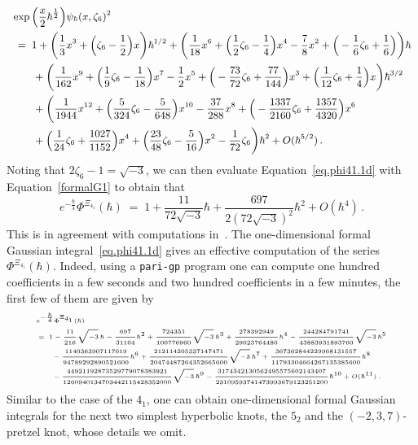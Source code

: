 \documentclass[12pt,reqno]{amsart}
\theoremstyle{definition}
\def\be{\begin{equation}}
\def\ee{\end{equation}}
\def\z{\zeta}
\def\hb{\hbar}
\renewcommand{\=}{\;=\;}
\begin{document}
\be
\begin{small}
\begin{aligned}
&\exp\Big(\frac{x}{2}\hbar^{\frac{1}{2}}\Big)\psi_{\hb}(x,\z_6)^2\\
&\=
1
+\bigg(\frac{1}{3}x^3 + \Big(\z_6 - \frac{1}{2}\Big)x\bigg)\hbar^{1/2}
+\bigg(\frac{1}{18}x^6 + \Big(\frac{1}{2}\z_6 - \frac{1}{4}\Big)x^4
- \frac{7}{8}x^2 + \Big(-\frac{1}{6}\z_6 + \frac{1}{6}\Big)\bigg)\hbar\\
&\qquad+ \bigg(\frac{1}{162}x^9 + \Big(\frac{1}{9}\z_6 - \frac{1}{18}\Big)x^7
- \frac{1}{2}x^5 + \Big(-\frac{73}{72}\z_6 + \frac{77}{144}\Big)x^3
+ \Big(\frac{1}{12}\z_6 + \frac{1}{4}\Big)x\bigg)\hbar^{3/2}\\
&\qquad+ \bigg(\frac{1}{1944}x^{12} + \Big(\frac{5}{324}\z_6
- \frac{5}{648}\Big)x^{10} - \frac{37}{288}x^8 + \Big(-\frac{1337}{2160}\z_6
+ \frac{1357}{4320}\Big)x^6\\
&\qquad+ \Big(\frac{1}{24}\z_6 + \frac{1027}{1152}\Big)x^4
+ \Big(\frac{23}{48}\z_6 - \frac{5}{16}\Big)x^2
- \frac{1}{72}\z_6\bigg)\hbar^{2}+O(\hbar^{5/2})\,.
\end{aligned}
\end{small}
\ee
Noting that $2\z_6-1=\sqrt{-3}$, we can then evaluate Equation~\eqref{eq.phi41.1d}
with Equation~\eqref{formalG1} to obtain that
\be
e^{-\frac{\hbar}{4}}\Phi^{\Xi_{4_1}}(\hbar) \=
1 + \frac{11}{72\sqrt{-3}}\hbar + \frac{697}{2(72\sqrt{-3})^2}\hbar^{2}+O(\hbar^{4})\,.
\ee
This is in agreement with computations in~\cite{DG,DGLZ,GZ:kashaev}.
The one-dimensional formal Gaussian integral~\eqref{eq.phi41.1d} gives an effective
computation of the series $\Phi^{\Xi_{4_1}}(\hbar)$.
%
%
Indeed, using a \texttt{pari-gp} program one can compute one
hundred coefficients in a few seconds and two hundred coefficients in a few minutes,
the first few of them are given by
\be
\begin{tiny}
\begin{aligned}
&e^{-\frac{\hbar}{4}}\Phi^{\Xi_{4_1}}(\hbar)\\
&=\;
1
- \frac{11}{216}\sqrt{-3}\,\hbar - \frac{697}{31104}\hbar^2
+ \frac{724351}{100776960}\sqrt{-3}\,\hbar^3
+ \frac{278392949}{29023764480}\hbar^4
- \frac{244284791741}{43883931893760}\sqrt{-3}\,\hbar^5\\
&\qquad- \frac{1140363907117019}{94789292890521600}\hbar^6
+ \frac{212114205337147471}{20474487264352665600}\sqrt{-3}\,\hbar^7
+ \frac{367362844229968131557}{11793304664267135385600}\hbar^8\\
&\qquad- \frac{44921192873529779078383921}{1260940134703442115428352000}\sqrt{-3}\,
\hbar^9
- \frac{3174342130562495575602143407}{23109593741473993679123251200}\hbar^{10}
+O(\hbar^{11})\,.
\end{aligned}
\end{tiny}
\ee
Similar to the case of the $4_1$, one can obtain one-dimensional formal Gaussian
integrals for the next two simplest hyperbolic knots, the $5_2$ and the
$(-2,3,7)$-pretzel knot, whose details we omit.
\end{document}
